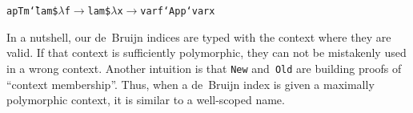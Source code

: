 \documentclass[9pt,preprint,authoryear]{sigplanconf}
\begin{document}
{{{}\vphantom{$\{$}}}\textcolor[rgb]{0,0,0.80}{\texttt{apTm}}\textcolor[rgb]{0,0,0.80}{\texttt{\mbox{\hspace{0.50em}}}}\textcolor[cmyk]{0,0.65,0.99,0}{\texttt{{\char `\=}}}\textcolor[rgb]{0,0,0.80}{\texttt{\mbox{\hspace{0.50em}}}}\textcolor[rgb]{0,0,0.80}{\texttt{lam}}\textcolor[rgb]{0,0,0.80}{\texttt{\mbox{\hspace{0.50em}}}}\textcolor[rgb]{0,0,0.80}{\texttt{\${}}}\textcolor[rgb]{0,0,0.80}{\texttt{\mbox{\hspace{0.50em}}}}\textcolor[cmyk]{0,0.65,0.99,0}{\texttt{$ \lambda $}}\textcolor[rgb]{0,0,0.80}{\texttt{\mbox{\hspace{0.50em}}}}\textcolor[rgb]{0,0,0.80}{\texttt{f}}\textcolor[rgb]{0,0,0.80}{\texttt{\mbox{\hspace{0.50em}}}}\textcolor[cmyk]{0,0.65,0.99,0}{\texttt{$ \rightarrow $}}\textcolor[rgb]{0,0,0.80}{\texttt{\mbox{\hspace{0.50em}}}}\textcolor[rgb]{0,0,0.80}{\texttt{lam}}\textcolor[rgb]{0,0,0.80}{\texttt{\mbox{\hspace{0.50em}}}}\textcolor[rgb]{0,0,0.80}{\texttt{\${}}}\textcolor[rgb]{0,0,0.80}{\texttt{\mbox{\hspace{0.50em}}}}\textcolor[cmyk]{0,0.65,0.99,0}{\texttt{$ \lambda $}}\textcolor[rgb]{0,0,0.80}{\texttt{\mbox{\hspace{0.50em}}}}\textcolor[rgb]{0,0,0.80}{\texttt{x}}\textcolor[rgb]{0,0,0.80}{\texttt{\mbox{\hspace{0.50em}}}}\textcolor[cmyk]{0,0.65,0.99,0}{\texttt{$ \rightarrow $}}\textcolor[rgb]{0,0,0.80}{\texttt{\mbox{\hspace{0.50em}}}}\textcolor[rgb]{0,0,0.80}{\texttt{var}}\textcolor[rgb]{0,0,0.80}{\texttt{\mbox{\hspace{0.50em}}}}\textcolor[rgb]{0,0,0.80}{\texttt{f}}\textcolor[rgb]{0,0,0.80}{\texttt{\mbox{\hspace{0.50em}}}}\textcolor[rgb]{0.70,0.13,0.13}{\texttt{{`}App{`}}}\textcolor[rgb]{0,0,0.80}{\texttt{\mbox{\hspace{0.50em}}}}\textcolor[rgb]{0,0,0.80}{\texttt{var}}\textcolor[rgb]{0,0,0.80}{\texttt{\mbox{\hspace{0.50em}}}}\textcolor[rgb]{0,0,0.80}{\texttt{x}}\textcolor[rgb]{0,0,0.80}{\texttt{{\nopagebreak \newline%
}\vphantom{$\{$}}}%


%
In a nutshell, our de{~}Bruijn indices are typed with the context
    where they are valid. If that context is sufficiently polymorphic,
    they can not be mistakenly used in a wrong context. Another
    intuition is that \textcolor[rgb]{0.70,0.13,0.13}{\texttt{New}} and{~}\textcolor[rgb]{0.70,0.13,0.13}{\texttt{Old}} are building proofs
    of {``}context membership{''}. Thus, when a de{~}Bruijn index is given a maximally polymorphic context,
    it is similar to a well-scoped name.%
\end{document}
